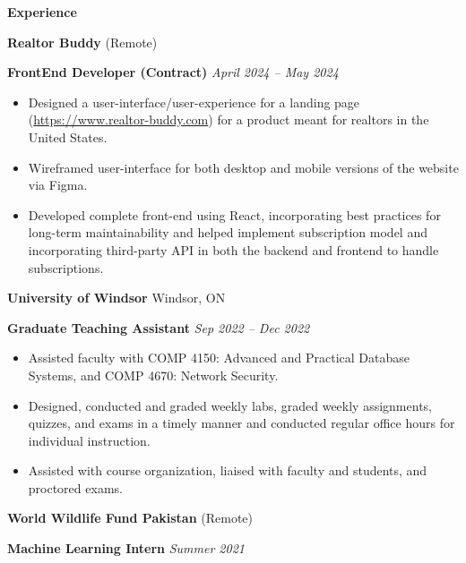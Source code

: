 \documentclass[12pt, a4paper]{article}
\begin{document}



\begin{center}
	\large\textbf{Experience}
\end{center}

\textbf{Realtor Buddy} \hfill (Remote)

\textbf{FrontEnd Developer (Contract)} \hfill \textit{April 2024 -- May 2024}
\begin{itemize}[noitemsep, topsep=0pt, partopsep=0pt, parsep=0pt]
	\item Designed a user-interface/user-experience for a landing page (\url{https://www.realtor-buddy.com}) for a product meant for realtors in the United States.
	\item Wireframed user-interface for both desktop and mobile versions of the website via Figma.
	\item Developed complete front-end using React, incorporating best practices for long-term maintainability and helped implement subscription model and incorporating third-party API in both the backend and frontend to handle subscriptions.
\end{itemize}

\vspace{16pt}
\textbf{University of Windsor} \hfill Windsor, ON

\textbf{Graduate Teaching Assistant} \hfill \textit{Sep 2022 -- Dec 2022}
\begin{itemize}[noitemsep, topsep=0pt, partopsep=0pt, parsep=0pt]
	\item Assisted faculty with COMP 4150: Advanced and Practical Database Systems, and COMP 4670: Network Security.
	\item Designed, conducted and graded weekly labs, graded weekly assignments, quizzes, and exams in a timely manner and conducted regular office hours for individual instruction.
	\item Assisted with course organization, liaised with faculty and students, and proctored exams.
\end{itemize}

\vspace{12pt}
\textbf{World Wildlife Fund Pakistan} \hfill (Remote)

\textbf{Machine Learning Intern} \hfill \textit{Summer 2021}
\end{document}
